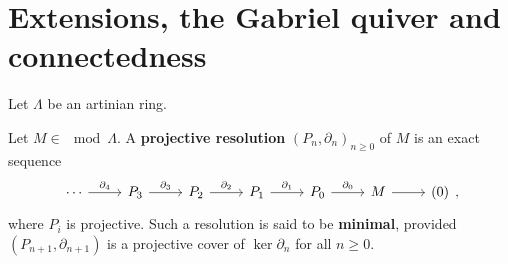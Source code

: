 %





\section{Extensions, the Gabriel quiver and connectedness}


Let $\Lambda$ be an artinian ring.

\begin{definition}
Let $M \in \mod{\Lambda}$. A \textbf{projective resolution} $(P_n,\partial_n)_{n\ge 0}$ of $M$ is an exact sequence
%
  \[ \begin{tikzcd}
      \cdots \rar["\partial_4"]&
      P_3 \rar["\partial_3"]&
      P_2 \rar["\partial_2"]&
      P_1 \rar["\partial_1"]&
      P_0 \rar["\partial_0"]& M \ar[r] & (0)
    \end{tikzcd},
    \]
%
where $P_i$ is projective. Such a resolution is said to be \textbf{minimal},
provided $(P_{n+1},\partial_{n+1})$ is a projective cover of $\ker \partial_n$
for all $n \ge 0$.
%
%
\end{definition}


